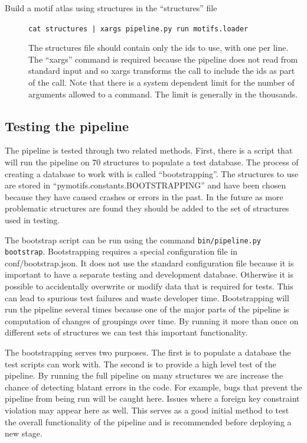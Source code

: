 \begin{description}
        \item [Build a motif atlas using structures in the ``structures'' file]
                {\tt cat structures | xargs pipeline.py run motifs.loader}

                The structures file should contain only the ids to use, with one
                per line. The ``xargs'' command is required because the pipeline
                does not read from standard input and so xargs transforms the
                call to include the ids as part of the call. Note that there is
                a system dependent limit for the number of arguments allowed to
                a command. The limit is generally in the thousands.
\end{description}

\subsection{Testing the pipeline}

The pipeline is tested through two related methods. First, there is a script
that will run the pipeline on 70 structures to populate a test database. The
process of creating a database to work with is called ``bootstrapping''. The
structures to use are stored in ``pymotifs.constants.BOOTSTRAPPING'' and have been
chosen because they have caused crashes or errors in the past. In the future as
more problematic structures are found they should be added to the set of
structures used in testing.

The bootstrap script can be run using the command {\tt bin/pipeline.py bootstrap}.
Bootstrapping requires a special configuration file in conf/bootstrap.json. It
does not use the standard configuration file because it is important to have a
separate testing and development database. Otherwise it is possible to
accidentally overwrite or modify data that is required for tests. This can lead
to spurious test failures and waste developer time. Bootstrapping will run the
pipeline several times because one of the major parts of the pipeline is
computation of changes of groupings over time. By running it more than once on
different sets of structures we can test this important functionality.

The bootstrapping serves two purposes. The first is to populate a database the
test scripts can work with. The second is to provide a high level test of the
pipeline. By running the full pipeline on many structures we are increase the
chance of detecting blatant errors in the code. For example, bugs that prevent
the pipeline from being run will be caught here. Issues where a foreign key
constraint violation may appear here as well. This serves as a good initial
method to test the overall functionality of the pipeline and is recommended
before deploying a new stage.

